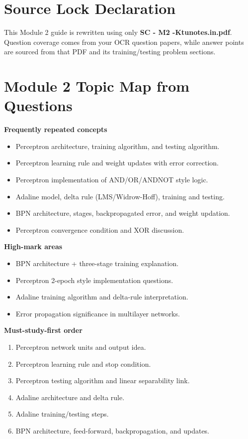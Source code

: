 \documentclass[11pt,a4paper]{article}
\begin{document}
\section*{Source Lock Declaration}
This Module 2 guide is rewritten using only \textbf{SC - M2 -Ktunotes.in.pdf}. Question coverage comes from your OCR question papers, while answer points are sourced from that PDF and its training/testing problem sections.

\section*{Module 2 Topic Map from Questions}
\textbf{Frequently repeated concepts}
\begin{itemize}
\item Perceptron architecture, training algorithm, and testing algorithm.
\item Perceptron learning rule and weight updates with error correction.
\item Perceptron implementation of AND/OR/ANDNOT style logic.
\item Adaline model, delta rule (LMS/Widrow-Hoff), training and testing.
\item BPN architecture, stages, backpropagated error, and weight updation.
\item Perceptron convergence condition and XOR discussion.
\end{itemize}

\textbf{High-mark areas}
\begin{itemize}
\item BPN architecture + three-stage training explanation.
\item Perceptron 2-epoch style implementation questions.
\item Adaline training algorithm and delta-rule interpretation.
\item Error propagation significance in multilayer networks.
\end{itemize}

\textbf{Must-study-first order}
\begin{enumerate}
\item Perceptron network units and output idea.
\item Perceptron learning rule and stop condition.
\item Perceptron testing algorithm and linear separability link.
\item Adaline architecture and delta rule.
\item Adaline training/testing steps.
\item BPN architecture, feed-forward, backpropagation, and updates.
\end{enumerate}
\end{document}
